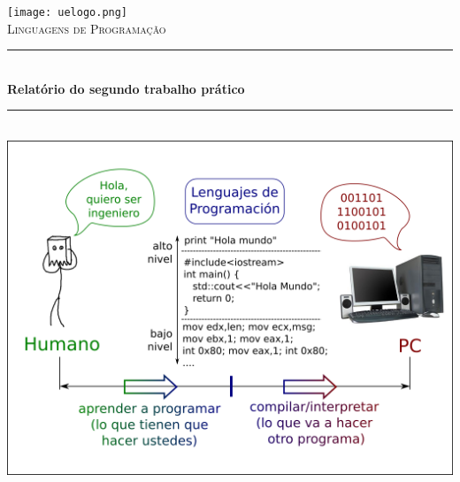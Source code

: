 \documentclass[a4paper,12pt,headings=small]{article}
\begin{document}
\begin{titlepage}

\newcommand{\HRule}{\rule{\linewidth}{0.5mm}} %

\center %





\texttt{[image: uelogo.png]}\\[0.5cm] 

 

\textsc{\Large Linguagens de Programação}\\[1cm]



\HRule \\[0.4cm]
{ \huge \bfseries Relatório do segundo trabalho prático}\\[0.4cm] 
\HRule \\[1 cm]
 
\includegraphics[scale=0.3]{lp.png}\\[0.5cm] 


\end{titlepage}
\end{document}
